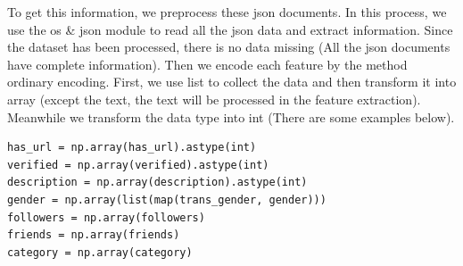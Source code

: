\documentclass[12pt,a4paper]{article}
\begin{document}
\vspace{1em}
\setlength\parindent{4.5em}
\vspace{1em}

\setlength{\parindent}{2em}
To get this information, we preprocess these json documents. In this process, we use the os \& json module to read all the json data and extract information. Since the dataset has been processed, there is no data missing (All the json documents have complete information). Then we encode each feature by the method ordinary encoding. First, we use list to collect the data and then transform it into array (except the text, the text will be processed in the feature extraction). Meanwhile we transform the data type into int (There are some examples below).

\begin{lstlisting}
has_url = np.array(has_url).astype(int)
verified = np.array(verified).astype(int)
description = np.array(description).astype(int)
gender = np.array(list(map(trans_gender, gender)))
followers = np.array(followers)
friends = np.array(friends)
category = np.array(category)
\end{lstlisting}
\end{document}

